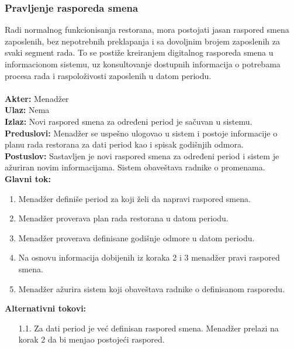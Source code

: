 \documentclass{article}
\begin{document}
\subsubsection{Pravljenje rasporeda smena}
Radi normalnog funkcionisanja restorana, mora postojati jasan raspored smena zaposlenih, bez nepotrebnih preklapanja i sa dovoljnim brojem zaposlenih za svaki segment rada. To se postiže kreiranjem digitalnog rasporeda smena u informacionom sistemu, uz konsultovanje dostupnih informacija o potrebama procesa rada i raspoloživosti zaposlenih u datom periodu.\\\\
\textbf{Akter:} Menadžer\\
\textbf{Ulaz:} Nema\\
\textbf{Izlaz:} Novi raspored smena za određeni period je sačuvan u sistemu.\\
\textbf{Preduslovi:} Menadžer se uspešno ulogovao u sistem i postoje informacije o planu rada restorana za dati period kao i spisak godišnjih odmora.\\
\textbf{Postuslov:} Sastavljen je novi raspored smena za određeni period i sistem je ažuriran novim informacijama. Sistem obaveštava radnike o promenama.\\
\textbf{Glavni tok:} 
\begin{enumerate}
\item Menadžer definiše period za koji želi da napravi raspored smena.
\item Menadžer proverava plan rada restorana u datom periodu.
\item Menadžer proverava definisane godišnje odmore u datom periodu.
\item Na osnovu informacija dobijenih iz koraka 2 i 3 menadžer pravi raspored smena.
\item Menadžer ažurira sistem koji obaveštava radnike o definisanom rasporedu.
\end{enumerate}
\textbf{Alternativni tokovi:} \\
\begin{itemize}
\item [1.1.] Za dati period je već definisan raspored smena. Menadžer prelazi na korak 2 da bi menjao postojeći raspored.
\end{itemize}
\end{document}
